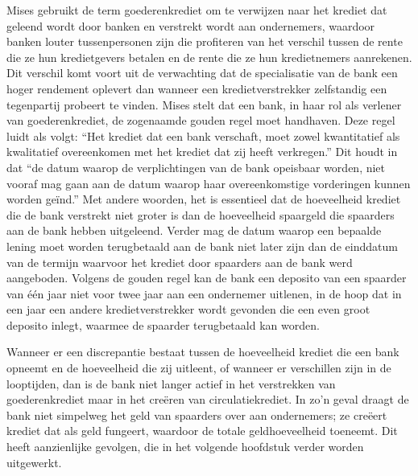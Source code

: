 Mises gebruikt de term goederenkrediet om te verwijzen naar het krediet dat geleend wordt door banken en verstrekt wordt aan ondernemers, waardoor banken louter tussenpersonen zijn die profiteren van het verschil tussen de rente die ze hun kredietgevers betalen en de rente die ze hun kredietnemers aanrekenen. Dit verschil komt voort uit de verwachting dat de specialisatie van de bank een hoger rendement oplevert dan wanneer een kredietverstrekker zelfstandig een tegenpartij probeert te vinden. Mises stelt dat een bank, in haar rol als verlener van goederenkrediet, de zogenaamde \textquotesingle gouden regel\textquotesingle{} moet handhaven. Deze regel luidt als volgt: ``Het krediet dat een bank verschaft, moet zowel kwantitatief als kwalitatief overeenkomen met het krediet dat zij heeft verkregen.'' Dit houdt in dat ``de datum waarop de verplichtingen van de bank opeisbaar worden, niet vooraf mag gaan aan de datum waarop haar overeenkomstige vorderingen kunnen worden geïnd.''\autocite{157} Met andere woorden, het is essentieel dat de hoeveelheid krediet die de bank verstrekt niet groter is dan de hoeveelheid spaargeld die spaarders aan de bank hebben uitgeleend. Verder mag de datum waarop een bepaalde lening moet worden terugbetaald aan de bank niet later zijn dan de einddatum van de termijn waarvoor het krediet door spaarders aan de bank werd aangeboden. Volgens de gouden regel kan de bank een deposito van een spaarder van één jaar niet voor twee jaar aan een ondernemer uitlenen, in de hoop dat in een jaar een andere kredietverstrekker wordt gevonden die een even groot deposito inlegt, waarmee de spaarder terugbetaald kan worden.

Wanneer er een discrepantie bestaat tussen de hoeveelheid krediet die een bank opneemt en de hoeveelheid die zij uitleent, of wanneer er verschillen zijn in de looptijden, dan is de bank niet langer actief in het verstrekken van goederenkrediet maar in het creëren van circulatiekrediet. In zo'n geval draagt de bank niet simpelweg het geld van spaarders over aan ondernemers; ze creëert krediet dat als geld fungeert, waardoor de totale geldhoeveelheid toeneemt. Dit heeft aanzienlijke gevolgen, die in het volgende hoofdstuk verder worden uitgewerkt.

